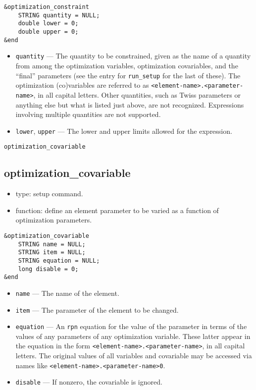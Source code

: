 \documentclass[11pt]{article}
\begin{document}
\begin{verbatim}
&optimization_constraint
    STRING quantity = NULL;
    double lower = 0;
    double upper = 0;
&end
\end{verbatim}

\begin{itemize}

\item \verb|quantity| --- The quantity to be constrained, given as the
name of a quantity from among the optimization variables, optimization
covariables, and the ``final'' parameters (see the entry for
\verb|run_setup| for the last of these).  The optimization
(co)variables are referred to as
\verb|<element-name>.<parameter-name>|, in all capital letters.  Other
quantities, such as Twiss parameters or anything else but what is
listed just above, are not recognized.  Expressions involving multiple
quantities are not supported.

\item \verb|lower|, \verb|upper| --- The lower and upper limits
allowed for the expression.

\end{itemize}

\begin{latexonly}
\newpage
\begin{center}{\Large\verb|optimization_covariable|}\end{center}
\end{latexonly}
\subsection{optimization\_covariable \label{subsec:optimizationcovariable}}

\begin{itemize}
\item type: setup command.
\item function: define an element parameter to be varied as a function of optimization parameters.
\end{itemize}

\begin{verbatim}
&optimization_covariable
    STRING name = NULL;
    STRING item = NULL;
    STRING equation = NULL;
    long disable = 0;
&end
\end{verbatim}

\begin{itemize}
\item \verb|name| --- The name of the element.
\item \verb|item| --- The parameter of the element to be changed.
\item \verb|equation| --- An {\tt rpn} equation for the value of the parameter in terms of the
values of any parameters of any optimization variable.  These latter appear in the equation in the
form \verb|<element-name>.<parameter-name>|, in all capital letters.  The original values of all
variables and covariable may be accessed via names like \verb|<element-name>.<parameter-name>0|.
\item \verb|disable| --- If nonzero, the covariable is ignored.
\end{itemize}
\end{document}
